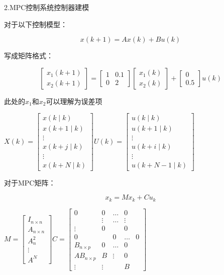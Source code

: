 2.MPC控制系统控制器建模

对于以下控制模型：

$$
x(k+1)=A x(k)+B u(k)
$$

写成矩阵格式：

$$
\left[\begin{array}{l}x_{1}(k+1) \\x_{2}(k+1)\end{array}\right]=\left[\begin{array}{cc}1 & 0.1 \\0 & 2\end{array}\right]\left[\begin{array}{l}x_{1}(k) \\x_{2}(k)\end{array}\right]+\left[\begin{array}{c}0 \\0.5\end{array}\right] u(k)
$$

此处的$x_{1}$和$x_{2}$可以理解为误差项

$X(k)=\left[\begin{array}{c}x(k \mid k) \\x(k+1 \mid k) \\\vdots\\ x(k+j \mid k)\\\vdots \\x(k+N \mid k)\end{array}\right]$$U(k)=\left[\begin{array}{c}u(k \mid k) \\u(k+1 \mid k) \\\vdots\\ u(k+i \mid k)\\\vdots \\u(k+N-1 \mid k)\end{array}\right]$

对于MPC矩阵：

$$
x_{k}=M x_{k}+C u_{k}
$$

$M=\left[\begin{array}{c}I_{n \times n} \\A_{n \times n} \\A_{n}^{2} \\\vdots \\A^{N}\end{array}\right]$$C=\left[\begin{array}{cccc}
0 & 0 & \ldots & 0 \\
& \vdots & \ldots & \vdots \\
\vdots & 0 & & 0 \\
0 & & 0 & \ldots & 0 \\
B_{n \times p} & 0 & \ldots & 0 \\
A B_{n \times p} & B & \vdots & 0 \\
\vdots & \vdots & & B
\end{array}\right]$

